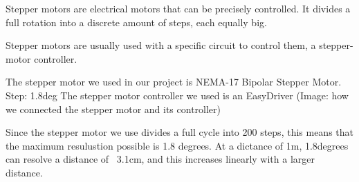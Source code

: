 Stepper motors are electrical motors that can be precisely controlled.
It divides a full rotation into a discrete amount of steps, each equally big.

Stepper motors are usually used with a specific circuit to control them, a stepper-motor controller.

The stepper motor we used in our project is NEMA-17 Bipolar Stepper Motor.
Step: 1.8deg
\cite{steppermotor}
The stepper motor controller we used is an EasyDriver
\cite{steppercontroller}
(Image: how we connected the stepper motor and its controller)

Since the stepper motor we use divides a full cycle into 200 steps, this means that the maximum resulustion possible is 1.8 degrees. At a dictance of 1m, 1.8degrees can resolve a distance of ~3.1cm, and this increases linearly with a larger distance.
